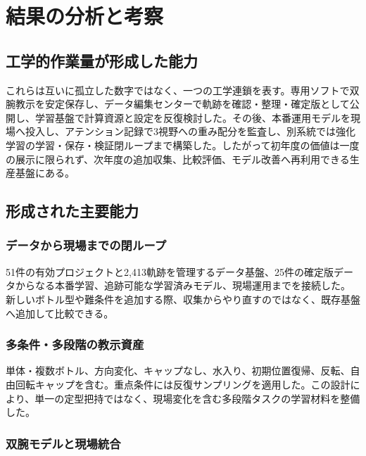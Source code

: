 \chapter{結果の分析と考察}

\section{工学的作業量が形成した能力}


これらは互いに孤立した数字ではなく、一つの工学連鎖を表す。専用ソフトで双腕教示を安定保存し、データ編集センターで軌跡を確認・整理・確定版として公開し、学習基盤で計算資源と設定を反復検討した。その後、本番運用モデルを現場へ投入し、アテンション記録で3視野への重み配分を監査し、別系統では強化学習の学習・保存・検証閉ループまで構築した。したがって初年度の価値は一度の展示に限られず、次年度の追加収集、比較評価、モデル改善へ再利用できる生産基盤にある。

\section{形成された主要能力}

\subsection{データから現場までの閉ループ}

51件の有効プロジェクトと2,413軌跡を管理するデータ基盤、25件の確定版データからなる本番学習、追跡可能な学習済みモデル、現場運用までを接続した。 新しいボトル型や難条件を追加する際、収集からやり直すのではなく、既存基盤へ追加して比較できる。

\subsection{多条件・多段階の教示資産}

単体・複数ボトル、方向変化、キャップなし、水入り、初期位置復帰、反転、自由回転キャップを含む。重点条件には反復サンプリングを適用した。この設計により、単一の定型把持ではなく、現場変化を含む多段階タスクの学習材料を整備した。

\subsection{双腕モデルと現場統合}

